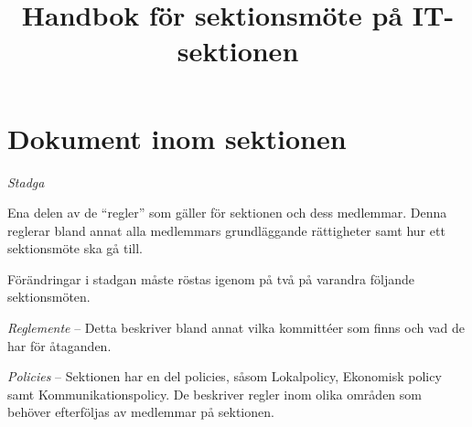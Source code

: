 \documentclass[11pt, noincludeaddress]{classes/cthit}
\let\tempone\itemize
\let\temptwo\enditemize
\renewenvironment{itemize}{\tempone\addtolength{\itemsep}{-0.3\baselineskip}}{\temptwo}
\begin{document}
\title{Handbok för sektionsmöte på IT-sektionen}


\makeheadfoot%
\makesimpletitle

\tableofcontents
\newpage

\setcounter{page}{1}



\section{Dokument inom sektionen}
\begin{itemize}
    \item \textit{Stadga}
    \begin{itemize}
        \item Ena delen av de “regler” som gäller för sektionen och dess medlemmar. Denna reglerar bland annat alla medlemmars grundläggande rättigheter samt hur ett sektionsmöte ska gå till.
        \item Förändringar i stadgan måste röstas igenom på två på varandra följande sektionsmöten.
    \end{itemize}
    \item \textit{Reglemente} -- Detta beskriver bland annat vilka kommittéer som finns och vad de har för åtaganden.
    \item \textit{Policies} -- Sektionen har en del policies, såsom Lokalpolicy, Ekonomisk policy samt Kommunikationspolicy. De beskriver regler inom olika områden som behöver efterföljas av medlemmar på sektionen.
\end{itemize}
\end{document}

